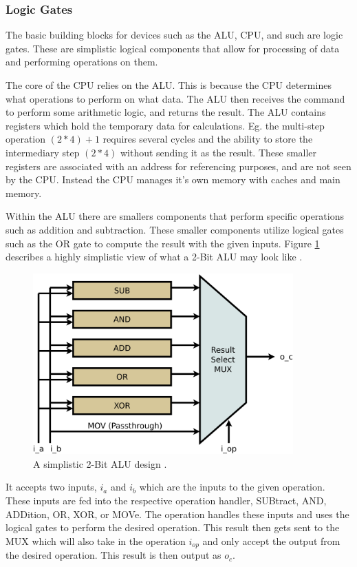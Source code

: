 \subsubsection{Logic Gates}\label{subsec:LogicGates}

The basic building blocks for devices such as the ALU, CPU, and such are logic gates.
These are simplistic logical components that allow for processing of data and performing operations on them.

The core of the CPU relies on the ALU.
This is because the CPU determines what operations to perform on what data.
The ALU then receives the command to perform some arithmetic logic, and returns the result.
The ALU contains registers which hold the temporary data for calculations.
Eg. the multi-step operation $(2 * 4) + 1$ requires several cycles and the ability to store the intermediary step $(2 * 4)$ without sending it as the result.
These smaller registers are associated with an address for referencing purposes, and are not seen by the CPU.
Instead the CPU manages it's own memory with caches and main memory.

Within the ALU there are smallers components that perform specific operations such as addition and subtraction.
These smaller components utilize logical gates such as the OR gate to compute the result with the given inputs.
Figure \ref{fig:2BitALUSimp} describes a highly simplistic view of what a 2-Bit ALU may look like \cite{SimpleALU}.

\begin{figure}[htb]
    \centering
    \includegraphics[width=10cm]{Images/alu-simple.png}
       \caption{A simplistic 2-Bit ALU design \cite{SimpleALU}.}
           \label{fig:2BitALUSimp}
\end{figure}

It accepts two inputs, $i_a$ and $i_b$ which are the inputs to the given operation.
These inputs are fed into the respective operation handler, SUBtract, AND, ADDition, OR, XOR, or MOVe.
The operation handles these inputs and uses the logical gates to perform the desired operation.
This result then gets sent to the MUX which will also take in the operation $i_{op}$ and only accept the output from the desired operation.
This result is then output as $o_c$.

